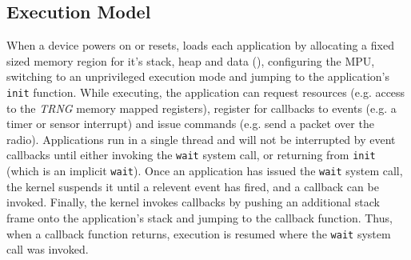 
\subsection{Execution Model}

When a device powers on or resets, \name loads each application by allocating a
fixed sized memory region for it's stack, heap and data
(), configuring the MPU, switching to an
unprivileged execution mode and jumping to the application's {\tt init}
function. While executing, the application can request resources (e.g. access to
the \emph{TRNG} memory mapped registers), register for callbacks to events (e.g. a
timer or sensor interrupt) and issue commands (e.g. send a packet over the
radio). Applications run in a single thread and will not be interrupted by event
callbacks until either invoking the {\tt wait} system call, or returning from
{\tt init} (which is an implicit {\tt wait}). Once an application has issued the
{\tt wait} system call, the kernel suspends it until a relevent event has fired,
and a callback can be invoked. Finally, the kernel invokes callbacks by pushing
an additional stack frame onto the application's stack and jumping to the
callback function. Thus, when a callback function returns, execution is resumed
where the {\tt wait} system call was invoked.


%

